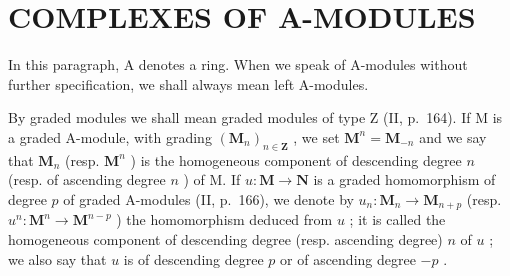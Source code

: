 \section{COMPLEXES OF A-MODULES}

In this paragraph, A denotes a ring. When we speak of A-modules without further specification, we shall always mean left A-modules.

By graded modules we shall mean graded modules of type Z (II, p.~164). If M is a graded A-module, with grading \((\mathbf{M}_n)_{n \in \mathbf{Z}}\) , we set \(\mathbf{M}^n = \mathbf{M}_{-n}\) and we say that \(\mathbf{M}_n\) (resp. \(\mathbf{M}^n\) ) is the homogeneous component of descending degree \(n\) (resp. of ascending degree \(n\) ) of M. If \(u: \mathbf{M} \to \mathbf{N}\) is a graded homomorphism of degree \(p\) of graded A-modules (II, p.~166), we denote by \(u_n: \mathbf{M}_n \to \mathbf{M}_{n+p}\) (resp. \(u^n: \mathbf{M}^n \to \mathbf{M}^{n-p}\) ) the homomorphism deduced from \(u\) ; it is called the homogeneous component of descending degree (resp. ascending degree) \(n\) of \(u\) ; we also say that \(u\) is of descending degree \(p\) or of ascending degree \(-p\) .

